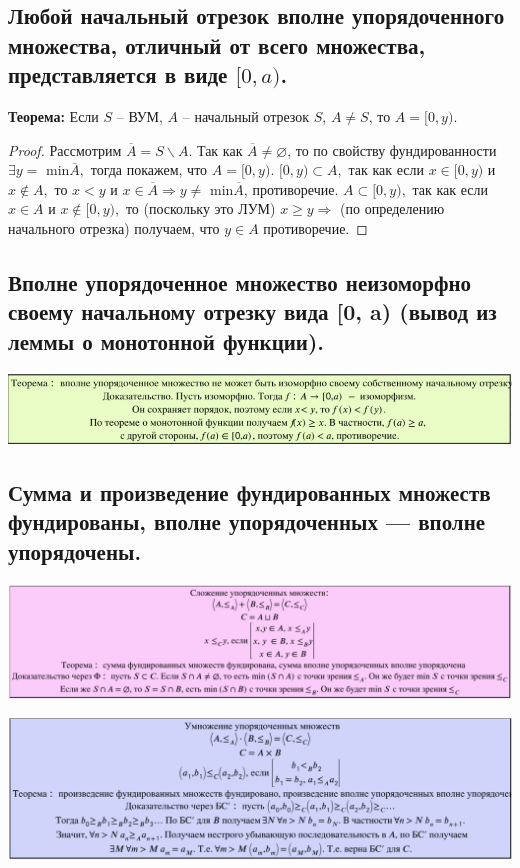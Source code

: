 \subsection{Любой начальный отрезок вполне упорядоченного множества, отличный от всего множества, представляется в виде $[0, a)$.}

\textbf{Теорема:} Если $S$ -- ВУМ, $A$ -- начальный отрезок $S$, $A \neq S$, то $A = [0, y)$.

\begin{proof}
    Рассмотрим $\overline{A} = S \backslash A$. Так как $\overline{A} \neq \varnothing$, то по свойству фундированности $\exists y =$ min$\overline{A},$ тогда покажем, что $A = [0, y)$. $[0, y) \subset A,$ так как если $x \in [0, y)$ и $x \notin A,$ то $x < y$ и $x \in \overline{A} \Rightarrow y \neq$ min$\overline{A}$, противоречие. $A \subset [0, y),$ так как если $x \in A$ и $x \notin [0, y),$ то (поскольку это ЛУМ) $x \geqslant y \Rightarrow$ (по определению начального отрезка) получаем, что $y \in A$ противоречие.
\end{proof}

\subsection{Вполне упорядоченное множество неизоморфно своему начальному отрезку вида
[0, a) (вывод из леммы о монотонной функции).}
\begin{center}
    \includegraphics[width = 17cm]{images/2 (определения)_m211.PNG}
\end{center}

\subsection{Сумма и произведение фундированных множеств фундированы, вполне упорядоченных — вполне упорядочены.}

\begin{center}
    \includegraphics[width = 17cm]{images/sum_fund.png}
\end{center}
\begin{center}
    \includegraphics[width = 17cm]{images/cdot_fund.png}
\end{center}

